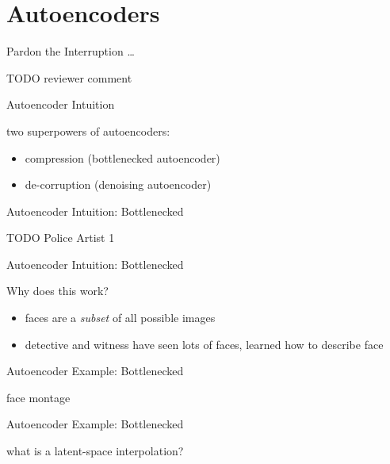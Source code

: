 \section{Autoencoders}

\begin{frame}{Pardon the Interruption \dots}

TODO reviewer comment

\end{frame}

\begin{frame}{Autoencoder Intuition}

two superpowers of autoencoders:
\begin{itemize}

\item compression (bottlenecked autoencoder)

\item de-corruption (denoising autoencoder)

\end{itemize}

\end{frame}

\begin{frame}{Autoencoder Intuition: Bottlenecked}

TODO Police Artist 1

\end{frame}

\begin{frame}{Autoencoder Intuition: Bottlenecked}

Why does this work?

\begin{itemize}

\item faces are a \textit{subset} of all possible images
\item detective and witness have seen lots of faces, learned how to describe face

\end{itemize}

\end{frame}

\begin{frame}{Autoencoder Example: Bottlenecked}

face montage

\end{frame}

\begin{frame}{Autoencoder Example: Bottlenecked}

what is a latent-space interpolation?

\end{frame}

